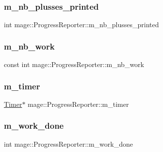 \hypertarget{classmage_1_1_progress_reporter_a5aeccd74959514c3db9b36f6abe4cc70}{}\label{classmage_1_1_progress_reporter_a5aeccd74959514c3db9b36f6abe4cc70} 
\subsubsection{\texorpdfstring{m\+\_\+nb\+\_\+plusses\+\_\+printed}{m\_nb\_plusses\_printed}}
{\footnotesize\ttfamily int mage\+::\+Progress\+Reporter\+::m\+\_\+nb\+\_\+plusses\+\_\+printed\hspace{0.3cm}{\ttfamily [private]}}

\hypertarget{classmage_1_1_progress_reporter_a8913c6a98282aaf1d4a5b1d0644a8824}{}\label{classmage_1_1_progress_reporter_a8913c6a98282aaf1d4a5b1d0644a8824} 
\subsubsection{\texorpdfstring{m\+\_\+nb\+\_\+work}{m\_nb\_work}}
{\footnotesize\ttfamily const int mage\+::\+Progress\+Reporter\+::m\+\_\+nb\+\_\+work\hspace{0.3cm}{\ttfamily [private]}}

\hypertarget{classmage_1_1_progress_reporter_aaca483b46968f0d39262305b5400a3e1}{}\label{classmage_1_1_progress_reporter_aaca483b46968f0d39262305b5400a3e1} 
\subsubsection{\texorpdfstring{m\+\_\+timer}{m\_timer}}
{\footnotesize\ttfamily \hyperlink{classmage_1_1_timer}{Timer}$\ast$ mage\+::\+Progress\+Reporter\+::m\+\_\+timer\hspace{0.3cm}{\ttfamily [private]}}

\hypertarget{classmage_1_1_progress_reporter_a0b773635d4366e0603b8ea83abdd01b5}{}\label{classmage_1_1_progress_reporter_a0b773635d4366e0603b8ea83abdd01b5} 
\subsubsection{\texorpdfstring{m\+\_\+work\+\_\+done}{m\_work\_done}}
{\footnotesize\ttfamily int mage\+::\+Progress\+Reporter\+::m\+\_\+work\+\_\+done\hspace{0.3cm}{\ttfamily [private]}}

